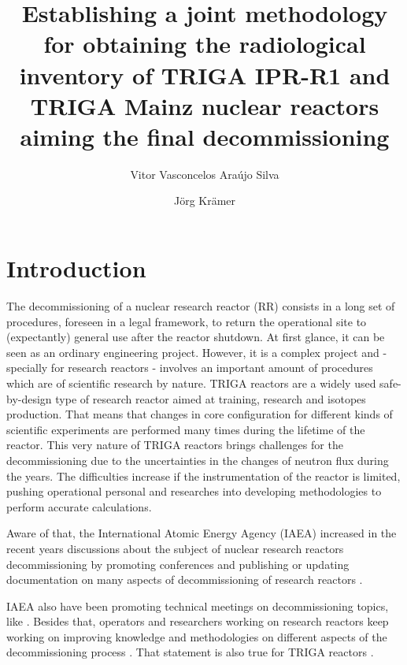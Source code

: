 \documentclass[11pt]{article} %
\title{Establishing a joint methodology for obtaining the radiological inventory of TRIGA IPR-R1 and TRIGA Mainz nuclear reactors aiming the final decommissioning}
\author[1]{Vitor Vasconcelos Araújo Silva}
\author[2]{Jörg Krämer}
\affil[1]{Centro de Desenvolvimento da Tecnologia Nuclear - CDTN/CNEN}
\affil[2]{Universität Johannes Gutenberg Mainz}
\date{} %
\begin{document}
\maketitle

\section{Introduction}

The decommissioning of a nuclear research reactor (RR) consists in a long set of procedures, foreseen in a legal framework, to return the operational site to (expectantly) general use after the reactor shutdown. At first glance, it can be seen as an ordinary engineering project. However, it is a complex project and - specially for research reactors - involves an important amount of procedures which are of scientific research by nature. TRIGA reactors \cite{TRIGA} are a widely used safe-by-design type of research reactor aimed at training, research and isotopes production. That means that changes in core configuration for different kinds of scientific experiments are performed many times during the lifetime of the reactor. This very nature of TRIGA reactors brings challenges for the decommissioning due to the uncertainties in the changes of neutron flux during the years. The difficulties increase if the instrumentation of the reactor is limited, pushing operational personal and researches into developing methodologies to perform accurate calculations.

Aware of that, the International Atomic Energy Agency (IAEA) increased in the recent years discussions about the subject of nuclear research reactors decommissioning by promoting conferences \cite{IAEA_PS_2025} and publishing or updating documentation on many aspects of decommissioning of research reactors \cite{IAEA_TRS_494_2024}.

IAEA also have been promoting technical meetings on decommissioning topics, like \cite{3TM}. Besides that, operators and researchers working on research reactors keep working on improving knowledge and methodologies on different aspects of the decommissioning process \cite{a}. That statement is also true for TRIGA reactors \cite{b}.


\end{document}
